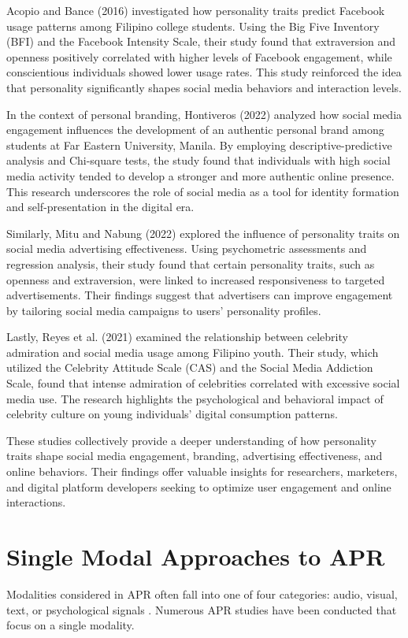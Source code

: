 Acopio and Bance (2016) investigated how personality traits predict Facebook usage patterns among Filipino college students. Using the Big Five Inventory (BFI) and the Facebook Intensity Scale, their study found that extraversion and openness positively correlated with higher levels of Facebook engagement, while conscientious individuals showed lower usage rates. This study reinforced the idea that personality significantly shapes social media behaviors and interaction levels.

In the context of personal branding, Hontiveros (2022) analyzed how social media engagement influences the development of an authentic personal brand among students at Far Eastern University, Manila. By employing descriptive-predictive analysis and Chi-square tests, the study found that individuals with high social media activity tended to develop a stronger and more authentic online presence. This research underscores the role of social media as a tool for identity formation and self-presentation in the digital era.

Similarly, Mitu and Nabung (2022) explored the influence of personality traits on social media advertising effectiveness. Using psychometric assessments and regression analysis, their study found that certain personality traits, such as openness and extraversion, were linked to increased responsiveness to targeted advertisements. Their findings suggest that advertisers can improve engagement by tailoring social media campaigns to users' personality profiles.

Lastly, Reyes et al. (2021) examined the relationship between celebrity admiration and social media usage among Filipino youth. Their study, which utilized the Celebrity Attitude Scale (CAS) and the Social Media Addiction Scale, found that intense admiration of celebrities correlated with excessive social media use. The research highlights the psychological and behavioral impact of celebrity culture on young individuals’ digital consumption patterns.

These studies collectively provide a deeper understanding of how personality traits shape social media engagement, branding, advertising effectiveness, and online behaviors. Their findings offer valuable insights for researchers, marketers, and digital platform developers seeking to optimize user engagement and online interactions.

\section {Single Modal Approaches to APR}
\label{sec: SMApproaches}
Modalities considered in APR often fall into one of four categories: audio, visual, text, or psychological signals \citep{Zhao2022}. Numerous APR studies have been conducted that focus on a single modality. 

